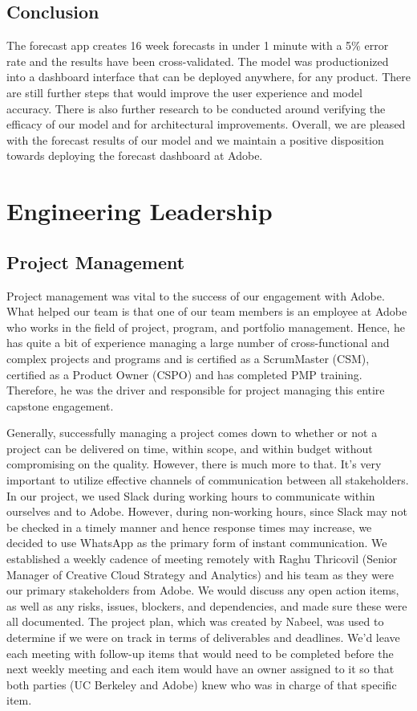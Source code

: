 \documentclass[11pt, oneside, authoryear]{report}
\begin{document}
\section{Conclusion}
The forecast app creates 16 week forecasts in under 1 minute with a 5\% error rate and the results have been cross-validated. The model was productionized into a dashboard interface that can be deployed anywhere, for any product. There are still further steps that would improve the user experience and model accuracy. There is also further research to be conducted around verifying the efficacy of our model and for architectural improvements. Overall, we are pleased with the forecast results of our model and we maintain a positive disposition towards deploying the forecast dashboard at Adobe.

\chapter{Engineering Leadership}

\section{Project Management}
Project management was vital to the success of our engagement with Adobe. What helped our team is that one of our team members is an employee at Adobe who works in the field of project, program, and portfolio management. Hence, he has quite a bit of experience managing a large number of cross-functional and complex projects and programs and is certified as a ScrumMaster (CSM), certified as a Product Owner (CSPO) and has completed PMP training. Therefore, he was the driver and responsible for project managing this entire capstone engagement.

Generally, successfully managing a project comes down to whether or not a project can be delivered on time, within scope, and within budget without compromising on the quality. However, there is much more to that. It's very important to utilize effective channels of communication between all stakeholders. In our project, we used Slack during working hours to communicate within ourselves and to Adobe. However, during non-working hours, since Slack may not be checked in a timely manner and hence response times may increase, we decided to use WhatsApp as the primary form of instant communication. We established a weekly cadence of meeting remotely with Raghu Thricovil (Senior Manager of Creative Cloud Strategy and Analytics) and his team as they were our primary stakeholders from Adobe. We would discuss any open action items, as well as any risks, issues, blockers, and dependencies, and made sure these were all documented. The project plan, which was created by Nabeel, was used to determine if we were on track in terms of deliverables and deadlines. We'd leave each meeting with follow-up items that would need to be completed before the next weekly meeting and each item would have an owner assigned to it so that both parties (UC Berkeley and Adobe) knew who was in charge of that specific item.
\end{document}

